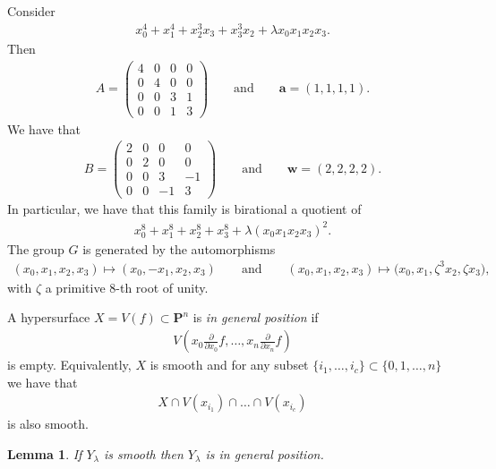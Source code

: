 \documentclass[11pt]{article}
\numberwithin{equation}{section}
\newtheorem{Lemma}[Theorem]{Lemma}
\begin{document}
\begin{Example} Consider
\begin{gather*} x_0^4+x_1^4+x_2^3x_3+x_3^3x_2+\lambda x_0x_1x_2x_3.\end{gather*}
Then
\begin{gather*} A=\left(\begin{matrix} 4&0&0&0\\0&4&0&0\\0&0&3&1\\0&0&1&3\end{matrix} \right) \qquad \text{and} \qquad \mathbf{a}=(1,1,1,1).\end{gather*}
We have that
\begin{gather*} B=\left(\begin{matrix} 2&0&0&0\\0&2&0&0\\0&0&3&-1\\0&0&-1&3\end{matrix} \right) \qquad \text{and} \qquad \mathbf{w}=(2,2,2,2). \end{gather*}
In particular, we have that this family is birational a quotient of
\begin{gather*} x_0^8+x_1^8+x_2^8+x_3^8+\lambda (x_0x_1x_2x_3)^2.\end{gather*}
The group $G$ is generated by the automorphisms
\begin{gather*} (x_0,x_1,x_2,x_3)\mapsto(x_0,-x_1,x_2,x_3)\qquad \text{and} \qquad
(x_0,x_1,x_2,x_3)\mapsto\big(x_0,x_1,\zeta^3 x_2,\zeta x_3\big),\end{gather*} with $\zeta$ a primitive $8$-th root of unity.
\end{Example}

\begin{Definition}\label{defGenPos} A hypersurface $X=V(f)\subset \mathbf{P}^n$ is \emph{in general position} if
\begin{gather*} V\left(x_0\frac{\partial}{\partial{x_0}} f, \dots,x_n\frac{\partial}{\partial{x_n}} f\right)\end{gather*}
is empty. Equivalently, $X$ is smooth and for any subset $\{i_1,\dots,i_c\} \subset \{0,1,\dots,n\}$ we have that
\begin{gather*} X \cap V(x_{i_1})\cap \dots \cap V(x_{i_c})\end{gather*}
is also smooth.
\end{Definition}

\begin{Lemma}\label{lemGenPos} If $Y_\lambda$ is smooth then $Y_{\lambda}$ is in general position.
\end{Lemma}
\end{document}
